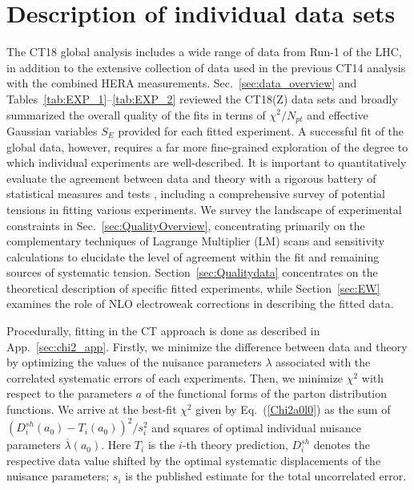 \section{Description of individual data sets}
\label{sec:Quality}

The CT18 global analysis includes a wide range of data from Run-1 of the LHC, in addition to the extensive collection of data used in the previous CT14 analysis with the combined HERA measurements.
Sec.~\ref{sec:data_overview} and Tables~\ref{tab:EXP_1}--\ref{tab:EXP_2}
reviewed the CT18(Z) data sets and broadly summarized the overall
quality of the fits in terms of $\chi^2/N_\mathit{pt}$ and effective Gaussian
variables $S_E$ provided for each fitted experiment.
%
A successful fit of the global data, however, requires a far more fine-grained exploration of the degree to which individual experiments are well-described.
It is important to quantitatively evaluate the agreement between data and theory with a rigorous battery of statistical measures and tests \cite{Kovarik:2019xvh}, including a
comprehensive survey of potential tensions in fitting various
experiments. We survey the landscape of experimental constraints
in Sec.~\ref{sec:QualityOverview}, concentrating
primarily on the complementary techniques of Lagrange Multiplier (LM)
scans and sensitivity calculations to elucidate the level of agreement
within the fit and remaining sources of systematic
tension. Section~\ref{sec:Qualitydata} concentrates on the theoretical
description of specific fitted experiments, while Section~\ref{sec:EW}
examines the role of NLO electroweak corrections in describing the
fitted data. 
%

Procedurally, fitting in the CT approach is done as described in App.~\ref{sec:chi2_app}. 
Firstly, we minimize the difference between data and theory by optimizing the values of the nuisance parameters $\lambda$ associated with the correlated systematic errors of each experiments. Then, we minimize $\chi^{2}$ with respect to the parameters $a$ of the functional forms of the parton distribution functions. We arrive at the best-fit  $\chi^{2}$  given by Eq.~(\ref{Chi2a0l0}) as the sum of $(D^\mathit{sh}_{i}(a_0)-T_{i}(a_0))^{2}/s_{i}^{2}$ and squares of optimal individual nuisance parameters $\overline \lambda (a_0)$. Here $T_i$ is the $i$-th theory prediction, $D^\mathit{sh}_{i}$ denotes the respective data value shifted by the optimal
systematic displacements of the nuisance parameters; $s_{i}$ is the published estimate for the total uncorrelated error.

